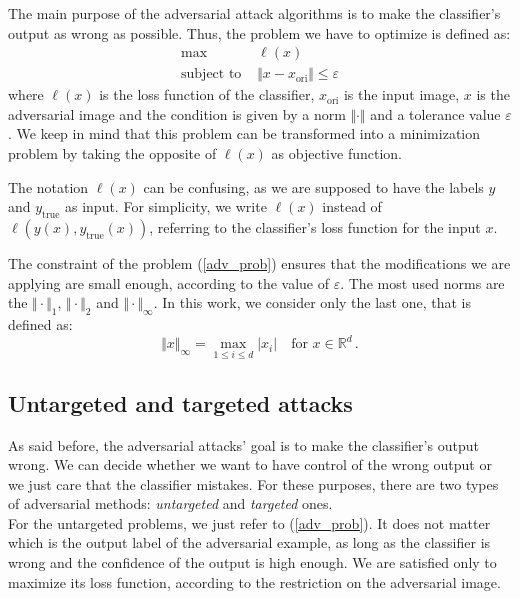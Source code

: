 \documentclass[10pt,twocolumn,letterpaper, english]{article}
\theoremstyle{definition}
\theoremstyle{plain}
\theoremstyle{plain}
\theoremstyle{plain}
\theoremstyle{plain}
\theoremstyle{remark}
\theoremstyle{remark}
\theoremstyle{definition}
\theoremstyle{definition}
\theoremstyle{definition}
\theoremstyle{definition}
\renewcommand{\epsilon}{\varepsilon}
\begin{document}
The main purpose of the adversarial attack algorithms is to make the classifier's output as wrong as possible. 
Thus, the problem we have to optimize is defined as: 
\begin{align}
    \max \, &\ell(x) \label{adv_prob} \\
    \text{subject to } & \Vert x - x_{\text{ori}} \Vert \le \epsilon \nonumber
\end{align}
where $\ell(x)$ is the loss function of the classifier, $x_{\text{ori}}$ is the input image, $x$ is the adversarial image and the condition is given by a norm $\Vert \cdot \Vert$ and a tolerance value $\epsilon$. 
We keep in mind that this problem can be transformed into a minimization problem by taking the opposite of $\ell(x)$ as objective function. 

The notation $\ell(x)$ can be confusing, as we are supposed to have the labels $y$ and $y_{\text{true}}$ as input. 
For simplicity, we write $\ell(x)$ instead of $\ell(y(x), y_{\text{true}}(x))$, referring to the classifier's loss function for the input $x$. 

The constraint of the problem (\ref{adv_prob}) ensures that the modifications we are applying are small enough, according to the value of $\epsilon$. 
The most used norms are the $\Vert \cdot \Vert_1$, $\Vert \cdot \Vert_2$ and $\Vert \cdot \Vert_{\infty}$. 
In this work, we consider only the last one, that is defined as: 
\begin{equation*}
    \Vert x \Vert_\infty = \max_{1\le i \le d} \vert x_i \vert \quad \text{for } x \in \mathbb{R}^d \,.
\end{equation*}

\subsection{Untargeted and targeted attacks} 

As said before, the adversarial attacks' goal is to make the classifier's output wrong. 
We can decide whether we want to have control of the wrong output or we just care that the classifier mistakes. 
For these purposes, there are two types of adversarial methods: \textit{untargeted} and \textit{targeted} ones. \\ 

For the untargeted problems, we just refer to (\ref{adv_prob}). 
It does not matter which is the output label of the adversarial example, as long as the classifier is wrong and the confidence of the output is high enough. 
We are satisfied only to maximize its loss function, according to the restriction on the adversarial image.\\
\end{document}
